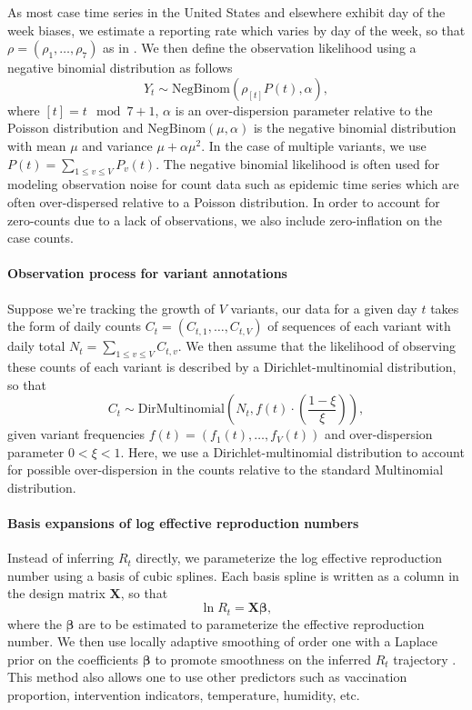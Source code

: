 \documentclass[11pt,oneside,letterpaper]{article}
\renewcommand{\vec}[1]{\boldsymbol{#1}}
\begin{document}
As most case time series in the United States and elsewhere exhibit day of the week biases, we estimate a reporting rate which varies by day of the week, so that $\rho = (\rho_{1}, \ldots, \rho_{7})$ as in \cite{Abbott2020}.
We then define the observation likelihood using a negative binomial distribution as follows
\begin{equation}
  Y_{t} \sim \text{NegBinom}(\rho_{[t]} P(t),  \alpha),
\end{equation}
where $[t] = t \mod 7 + 1$, $\alpha$ is an over-dispersion parameter relative to the Poisson distribution and $\text{NegBinom}(\mu, \alpha)$ is the negative binomial distribution with mean $\mu$ and variance  $\mu + \alpha\mu^{2}$. In the case of multiple variants, we use $P(t) = \sum_{1\leq v \leq V} P_{v}(t)$.
The negative binomial likelihood is often used for modeling observation noise for count data such as epidemic time series which are often over-dispersed relative to a Poisson distribution.
In order to account for zero-counts due to a lack of observations, we also include zero-inflation on the case counts.

\paragraph{Observation process for variant annotations}%

Suppose we're tracking the growth of $V$ variants, our data for a given day $t$ takes the form of daily counts $C_{t} = (C_{t,1}, \ldots, C_{t,V})$ of sequences of each variant with daily total $N_{t} = \sum_{1\leq v \leq V} C_{t, v}$.
We then assume that the likelihood of observing these counts of each variant is described by a Dirichlet-multinomial distribution, so that
\begin{equation}
    C_{t} \sim \text{DirMultinomial}\left(N_{t}, f(t)\cdot \left(\frac{1-\xi}{\xi}\right)\right),
\end{equation}
given variant frequencies $f(t) = (f_{1}(t), \ldots, f_{V}(t))$ and over-dispersion parameter $0<\xi<1$.
Here, we use a Dirichlet-multinomial distribution to account for possible over-dispersion in the counts relative to the standard Multinomial distribution.

\paragraph{Basis expansions of log effective reproduction numbers}%

Instead of inferring $R_{t}$ directly, we parameterize the log effective reproduction number using a basis of cubic splines.
Each basis spline is written as a column in the design matrix $\vec{X}$, so that
\begin{equation}
  \ln R_{t} = \vec{X} \vec{\beta},
\end{equation}
where the $\vec{\beta}$ are to be estimated to parameterize the effective reproduction number.
We then use locally adaptive smoothing of order one with a Laplace prior on the coefficients $\vec{\beta}$ to promote smoothness on the inferred $R_t$ trajectory \cite{Faulkner2018}.
This method also allows one to use other predictors such as vaccination proportion, intervention indicators, temperature, humidity, etc.
\end{document}
